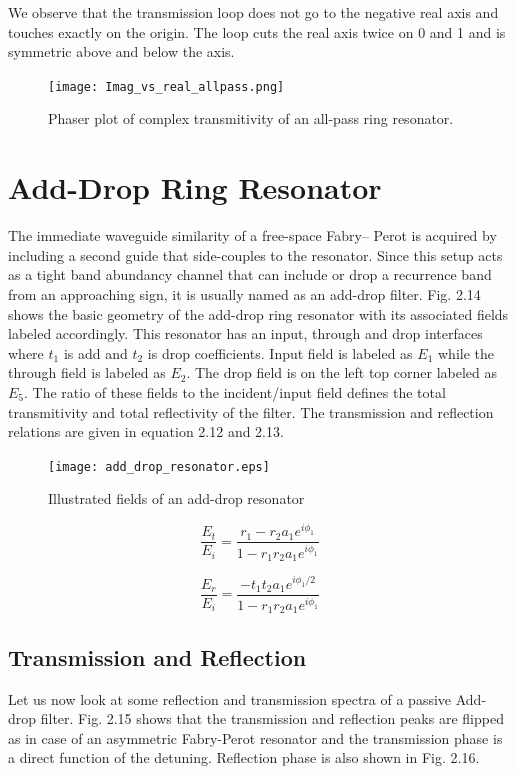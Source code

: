 We observe that the transmission loop does not go to the negative real axis and touches exactly on the origin. The loop cuts the real axis twice on 0 and 1 and is symmetric above and below the axis. 
\begin{figure}[h]
\centering
\texttt{[image: Imag\_vs\_real\_allpass.png]}
\caption{Phaser plot of complex transmitivity of an all-pass ring resonator.}
\end{figure}


\section{Add-Drop Ring Resonator}
The immediate waveguide similarity of a free-space Fabry– Perot is acquired by including a second guide that side-couples to the resonator.
Since this setup acts as a tight band abundancy channel that can include or drop a recurrence band from an approaching sign, it is usually named as an add-drop filter. Fig. 2.14 shows the basic geometry of the add-drop ring resonator with its associated fields labeled accordingly. This resonator has an input, through and drop interfaces where $t_{1}$ is add and $t_{2}$ is drop coefficients. Input field is labeled as $E_{1}$ while the through field is labeled as $E_{2}$. The drop field is on the left top corner labeled as $E_{5}$. The ratio of these fields to the incident/input field defines the total transmitivity and total reflectivity of the filter. The transmission and reflection relations are given in equation 2.12 and 2.13.
\begin{figure}[h]
\centering
\texttt{[image: add\_drop\_resonator.eps]}
\caption{Illustrated fields of an add-drop resonator}
\end{figure}


\begin{equation}
\frac{E_{t}}{E_{i}} = \frac{r_{1} - r_{2} a_{1} e^{i\phi_{1}}}{1 - r_{1} r_{2} a_{1} e^{i\phi_{1}}}
\end{equation}

\begin{equation}
\frac{E_{r}}{E_{i}} = \frac{- t_{1} t_{2} a_{1} e^{i \phi_{1}/2}}{1 - r_{1} r_{2} a_{1} e^{i\phi_{1}}}
\end{equation}



\subsection{Transmission and Reflection}
Let us now look at some reflection and transmission spectra of a passive Add- drop filter. Fig. 2.15 shows that the transmission and reflection peaks are flipped as in case of an asymmetric Fabry-Perot resonator and the transmission phase is a direct function of the detuning. Reflection phase is also shown in Fig. 2.16.

